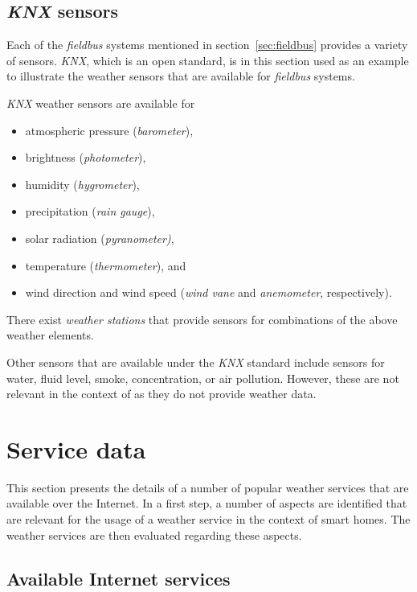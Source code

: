 \subsection{\emph{KNX} sensors}

Each of the \emph{fieldbus} systems mentioned in section~\ref{sec:fieldbus} provides a variety of sensors. \emph{KNX}, which is an open standard, is in this section used as an example to illustrate the weather sensors that are available for \emph{fieldbus} systems.

\emph{KNX} weather sensors are available for
\begin{itemize}
  \item atmospheric pressure (\emph{barometer}),
  \item brightness (\emph{photometer}),
  \item humidity (\emph{hygrometer}),
  \item precipitation (\emph{rain gauge}),
  \item solar radiation (\emph{pyranometer)},
  \item temperature (\emph{thermometer}), and
  \item wind direction and wind speed (\emph{wind vane} and \emph{anemometer}, respectively).
\end{itemize}

There exist \emph{weather stations} that provide sensors for combinations of the above weather elements.

Other sensors that are available under the \emph{KNX} standard include sensors for water, fluid level, smoke,  concentration, or air pollution. However, these are not relevant in the context of \smarthomeweather as they do not provide weather data.


\section{Service data}
\label{sec:weather_services}

This section presents the details of a number of popular weather services that are available over the Internet. In a first step, a number of aspects are identified that are relevant for the usage of a weather service in the context of smart homes. The weather services are then evaluated regarding these aspects.

\subsection{Available Internet services}
\label{sec:internet_services}

